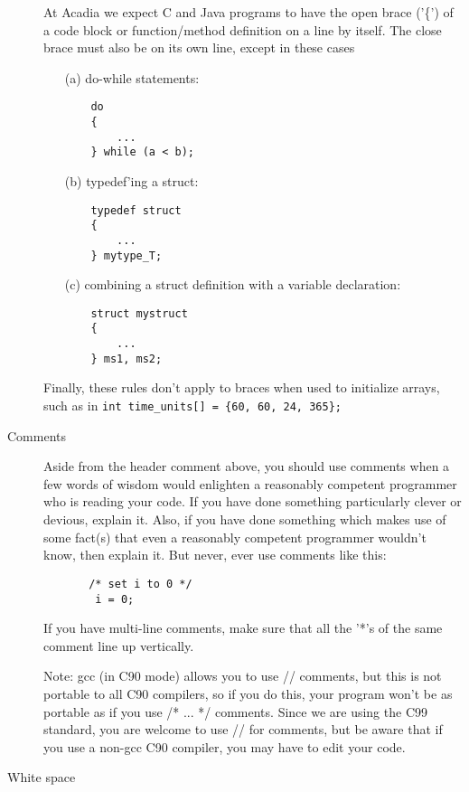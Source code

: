 \begin{description}
    At Acadia we expect C and Java programs to have the open brace
    ('\{') of a code block or function/method definition on a line by
    itself.  The close brace must also be on its own line, except in
    these cases
    \begin{enumerate}
    \item[(a)] do-while statements:
\begin{verbatim}
    do
    {
        ...
    } while (a < b);
\end{verbatim}
    \item[(b)] typedef'ing a struct:
\begin{verbatim}
    typedef struct
    {
        ...
    } mytype_T;
\end{verbatim}
    \item[(c)] combining a struct definition with a variable declaration:
\begin{verbatim}
    struct mystruct
    {
        ...
    } ms1, ms2;
\end{verbatim}
\end{enumerate}
    Finally, these rules don't apply to braces when used to initialize
    arrays, such as in
    \verb|int time_units[] = {60, 60, 24, 365};|

\clearpage
\item[Comments] \hfill

    Aside from the header comment above, you should use comments when
    a few words of wisdom would enlighten a reasonably competent
    programmer who is reading your code.  If you have done something
    particularly clever or devious, explain it.  Also, if you have
    done something which makes use of some fact(s) that even a
    reasonably competent programmer wouldn't know, then explain it.
    But never, ever use comments like this:
 \begin{verbatim}       /* set i to 0 */
        i = 0;
\end{verbatim}
    If you have multi-line comments, make sure that all the '*'s of
    the same comment line up vertically.

    Note: gcc (in C90 mode) allows you to use // comments, but this is
    not portable to all C90 compilers, so if you do this, your program
    won't be as portable as if you use /* ... */ comments.
    Since we are using the C99 standard, you are welcome to use // for
    comments, but be aware that if you use a non-gcc C90 compiler, you
    may have to edit your code.


\item[White space]\hfill


\end{description}
